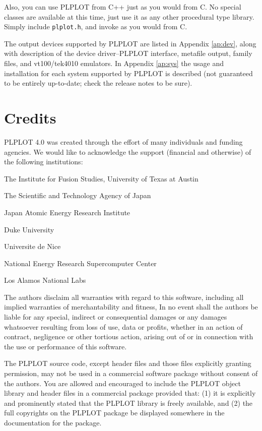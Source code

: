 Also, you can use PLPLOT from C++ just as you would from C.  No special
classes are available at this time, just use it as any other procedural
type library.  Simply include {\tt plplot.h}, and invoke as you would from
C. 

The output devices supported by PLPLOT are listed in Appendix \ref{ap:dev},
along with description of the device driver--PLPLOT interface, metafile
output, family files, and vt100/tek4010 emulators.  In Appendix
\ref{ap:sys} the usage and installation for each system supported by PLPLOT
is described (not guaranteed to be entirely up-to-date; check the release
notes to be sure). 

\section {Credits}
\label{sec:credits}

PLPLOT 4.0 was created through the effort of many individuals and funding
agencies.  We would like to acknowledge the support (financial and
otherwise) of the following institutions:
\begin{description}
\item	The Institute for Fusion Studies, University of Texas at Austin
\item	The Scientific and Technology Agency of Japan
\item	Japan Atomic Energy Research Institute
\item	Duke University
\item	Universite de Nice
\item	National Energy Research Supercomputer Center
\item	Los Alamos National Labs
\end{description}

The authors disclaim all warranties with regard to this software, including
all implied warranties of merchantability and fitness, In no event shall
the authors be liable for any special, indirect or consequential damages or
any damages whatsoever resulting from loss of use, data or profits, whether
in an action of contract, negligence or other tortious action, arising out
of or in connection with the use or performance of this software. 

The PLPLOT source code, except header files and those files explicitly
granting permission, may not be used in a commercial software package
without consent of the authors.  You are allowed and encouraged to include
the PLPLOT object library and header files in a commercial package provided
that: (1) it is explicitly and prominently stated that the PLPLOT library
is freely available, and (2) the full copyrights on the PLPLOT package be
displayed somewhere in the documentation for the package. 

